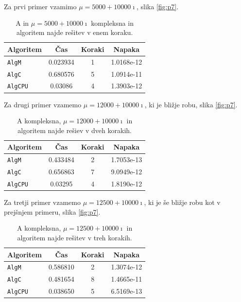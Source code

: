 \documentclass[12pt,a4paper]{amsart}
\theoremstyle{definition}
\theoremstyle{plain}
\begin{document}
Za prvi primer vzamimo $\mu = 5000+10000\imath$, slika \ref{fig:p7}.


\begin{table}[H]
\caption{A in $\mu = 5000+10000\imath$ kompleksna in algoritem najde rešitev v enem koraku.}
\begin{tabular}{|l|c|c|c|}
\hline
Algoritem & Čas & Koraki & Napaka\\
\hline
\hline
\verb+AlgM+ &0.023934&1&1.0168e-12\\
\hline
\verb+AlgC+ &0.680576&5& 1.0914e-11\\
\hline
\verb+AlgCPU+ &0.03086&4&1.3903e-12\\
\hline
\end{tabular}

\label{t7}
\end{table}

Za drugi primer vzamemo $\mu = 12000+10000\imath$, ki je bližje robu, slika \ref{fig:p7}.

\begin{table}[H]
\caption{A kompleksna, $\mu = 12000+10000\imath$ in algoritem najde rešiev v dveh korakih.}
\begin{tabular}{|l|c|c|c|}
\hline
Algoritem & Čas & Koraki & Napaka\\
\hline
\hline
\verb+AlgM+& 0.433484&2 &1.7053e-13 \\
\hline
\verb+AlgC+ &0.656863&7&9.0949e-12\\
\hline
\verb+AlgCPU+ &0.03295&4&1.8190e-12\\
\hline
\end{tabular}

\label{t8}
\end{table}

Za tretji primer vzamemo $\mu = 12500+10000\imath$, ki je še bližje robu kot v prejšnjem primeru, slika \ref{fig:p7}.


\begin{table}[H]
\caption{A kompleksna, $\mu = 12500+10000\imath$ in algoritem najde rešitev v treh korakih.}
\begin{tabular}{|l|c|c|c|}
\hline
Algoritem & Čas & Koraki & Napaka\\
\hline
\hline
\verb+AlgM+ &0.586810&2&1.3074e-12\\
\hline
\verb+AlgC+ &0.481654 &8 & 1.4665e-11\\
\hline
\verb+AlgCPU+ & 0.038650& 5&6.5169e-13 \\
\hline
\end{tabular}

\label{t9}
\end{table}
\end{document}
